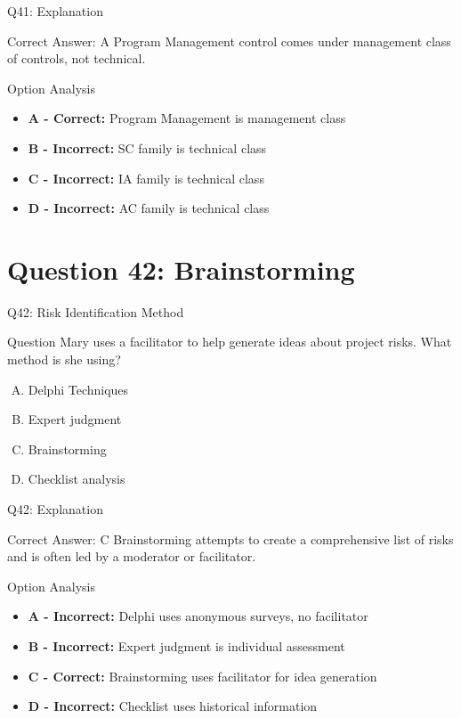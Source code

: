 \documentclass{beamer}
\begin{document}
	\begin{frame}{Q41: Explanation}
		\begin{block}{Correct Answer: A}
			Program Management control comes under management class of controls, not technical.
		\end{block}
		\begin{block}{Option Analysis}
			\begin{itemize}
				\item \textbf{A - Correct:} Program Management is management class
				\item \textbf{B - Incorrect:} SC family is technical class
				\item \textbf{C - Incorrect:} IA family is technical class
				\item \textbf{D - Incorrect:} AC family is technical class
			\end{itemize}
		\end{block}
	\end{frame}
	
	\section{Question 42: Brainstorming}
	
	\begin{frame}{Q42: Risk Identification Method}
		\begin{block}{Question}
			Mary uses a facilitator to help generate ideas about project risks. What method is she using?
		\end{block}
		\begin{enumerate}[(A)]
			\item Delphi Techniques
			\item Expert judgment
			\item Brainstorming
			\item Checklist analysis
		\end{enumerate}
	\end{frame}
	
	\begin{frame}{Q42: Explanation}
		\begin{block}{Correct Answer: C}
			Brainstorming attempts to create a comprehensive list of risks and is often led by a moderator or facilitator.
		\end{block}
		\begin{block}{Option Analysis}
			\begin{itemize}
				\item \textbf{A - Incorrect:} Delphi uses anonymous surveys, no facilitator
				\item \textbf{B - Incorrect:} Expert judgment is individual assessment
				\item \textbf{C - Correct:} Brainstorming uses facilitator for idea generation
				\item \textbf{D - Incorrect:} Checklist uses historical information
			\end{itemize}
		\end{block}
	\end{frame}
	
\end{document}
